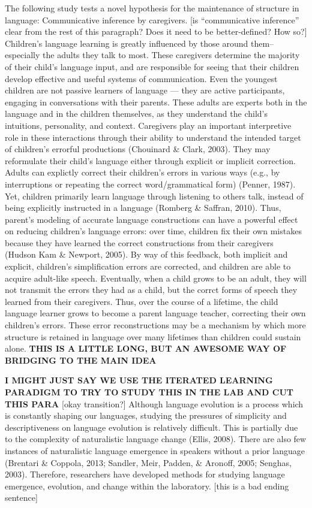 \documentclass[10pt, letterpaper]{article}
\begin{document}
The following study tests a novel hypothesis for the maintenance of
structure in language: Communicative inference by caregivers. {[}is
``communicative inference'' clear from the rest of this paragraph? Does
it need to be better-defined? How so?{]} Children's language learning is
greatly influenced by those around them--especially the adults they talk
to most. These caregivers determine the majority of their child's
language input, and are responsible for seeing that their children
develop effective and useful systems of communication. Even the youngest
children are not passive learners of language --- they are active
participants, engaging in conversations with their parents. These adults
are experts both in the language and in the children themselves, as they
understand the child's intuitions, personality, and context. Caregivers
play an important interpretive role in these interactions through their
ability to understand the intended target of children's errorful
productions (Chouinard \& Clark, 2003). They may reformulate their
child's language either through explicit or implicit correction. Adults
can explictly correct their children's errors in various ways (e.g., by
interruptions or repeating the correct word/grammatical form) (Penner,
1987). Yet, children primarily learn language through listening to
others talk, instead of being explicitly instructed in a language
(Romberg \& Saffran, 2010). Thus, parent's modeling of accurate language
constructions can have a powerful effect on reducing children's language
errors: over time, children fix their own mistakes because they have
learned the correct constructions from their caregivers (Hudson Kam \&
Newport, 2005). By way of this feedback, both implicit and explicit,
children's simplification errors are corrected, and children are able to
acquire adult-like speech. Eventually, when a child grows to be an
adult, they will not transmit the errors they had as a child, but the
corrct forms of speech they learned from their caregivers. Thus, over
the course of a lifetime, the child language learner grows to become a
parent language teacher, correcting their own children's errors. These
error reconstructions may be a mechanism by which more structure is
retained in language over many lifetimes than children could sustain
alone. \textbf{THIS IS A LITTLE LONG, BUT AN AWESOME WAY OF BRIDGING TO
THE MAIN IDEA}

\textbf{I MIGHT JUST SAY WE USE THE ITERATED LEARNING PARADIGM TO TRY TO
STUDY THIS IN THE LAB AND CUT THIS PARA} {[}okay transition?{]} Although
language evolution is a process which is constantly shaping our
languages, studying the pressures of simplicity and descriptiveness on
language evolution is relatively difficult. This is partially due to the
complexity of naturalistic language change (Ellis, 2008). There are also
few instances of naturalistic language emergence in speakers without a
prior language (Brentari \& Coppola, 2013; Sandler, Meir, Padden, \&
Aronoff, 2005; Senghas, 2003). Therefore, researchers have developed
methods for studying language emergence, evolution, and change within
the laboratory. {[}this is a bad ending sentence{]}
\end{document}
